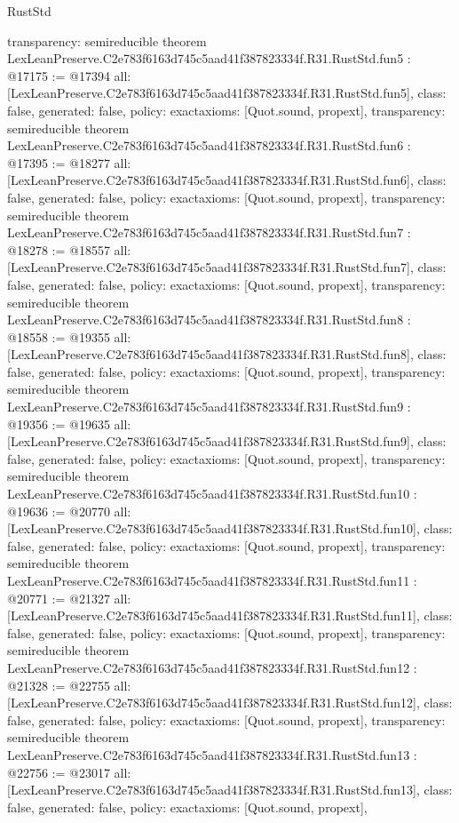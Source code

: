\begin{lexlean}{RustStd}
\begin{coremodule}
{  transparency: semireducible
}
theorem LexLeanPreserve.C2e783f6163d745c5aad41f387823334f.R31.RustStd.fun5 : @17175 := @17394 {
  all: [LexLeanPreserve.C2e783f6163d745c5aad41f387823334f.R31.RustStd.fun5],
  class: false,
  generated: false,
  policy: exact{axioms: [Quot.sound, propext]},
  transparency: semireducible
}
theorem LexLeanPreserve.C2e783f6163d745c5aad41f387823334f.R31.RustStd.fun6 : @17395 := @18277 {
  all: [LexLeanPreserve.C2e783f6163d745c5aad41f387823334f.R31.RustStd.fun6],
  class: false,
  generated: false,
  policy: exact{axioms: [Quot.sound, propext]},
  transparency: semireducible
}
theorem LexLeanPreserve.C2e783f6163d745c5aad41f387823334f.R31.RustStd.fun7 : @18278 := @18557 {
  all: [LexLeanPreserve.C2e783f6163d745c5aad41f387823334f.R31.RustStd.fun7],
  class: false,
  generated: false,
  policy: exact{axioms: [Quot.sound, propext]},
  transparency: semireducible
}
theorem LexLeanPreserve.C2e783f6163d745c5aad41f387823334f.R31.RustStd.fun8 : @18558 := @19355 {
  all: [LexLeanPreserve.C2e783f6163d745c5aad41f387823334f.R31.RustStd.fun8],
  class: false,
  generated: false,
  policy: exact{axioms: [Quot.sound, propext]},
  transparency: semireducible
}
theorem LexLeanPreserve.C2e783f6163d745c5aad41f387823334f.R31.RustStd.fun9 : @19356 := @19635 {
  all: [LexLeanPreserve.C2e783f6163d745c5aad41f387823334f.R31.RustStd.fun9],
  class: false,
  generated: false,
  policy: exact{axioms: [Quot.sound, propext]},
  transparency: semireducible
}
theorem LexLeanPreserve.C2e783f6163d745c5aad41f387823334f.R31.RustStd.fun10 : @19636 := @20770 {
  all: [LexLeanPreserve.C2e783f6163d745c5aad41f387823334f.R31.RustStd.fun10],
  class: false,
  generated: false,
  policy: exact{axioms: [Quot.sound, propext]},
  transparency: semireducible
}
theorem LexLeanPreserve.C2e783f6163d745c5aad41f387823334f.R31.RustStd.fun11 : @20771 := @21327 {
  all: [LexLeanPreserve.C2e783f6163d745c5aad41f387823334f.R31.RustStd.fun11],
  class: false,
  generated: false,
  policy: exact{axioms: [Quot.sound, propext]},
  transparency: semireducible
}
theorem LexLeanPreserve.C2e783f6163d745c5aad41f387823334f.R31.RustStd.fun12 : @21328 := @22755 {
  all: [LexLeanPreserve.C2e783f6163d745c5aad41f387823334f.R31.RustStd.fun12],
  class: false,
  generated: false,
  policy: exact{axioms: [Quot.sound, propext]},
  transparency: semireducible
}
theorem LexLeanPreserve.C2e783f6163d745c5aad41f387823334f.R31.RustStd.fun13 : @22756 := @23017 {
  all: [LexLeanPreserve.C2e783f6163d745c5aad41f387823334f.R31.RustStd.fun13],
  class: false,
  generated: false,
  policy: exact{axioms: [Quot.sound, propext]},
}
\end{coremodule}
\end{lexlean}
